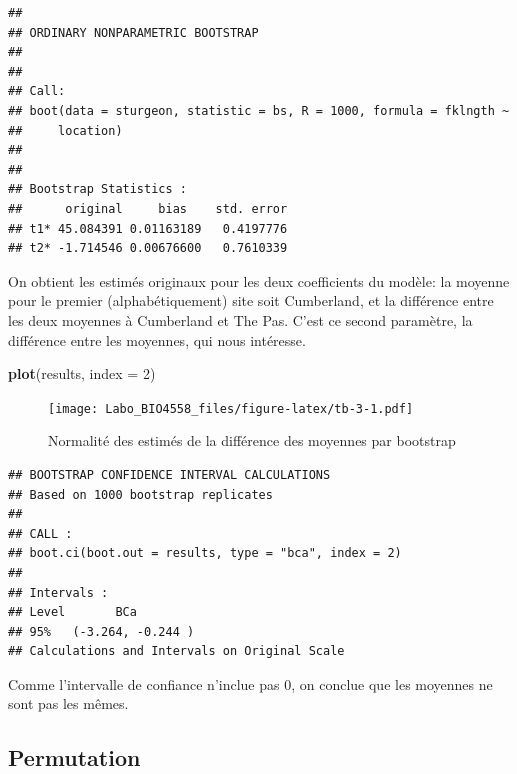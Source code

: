 \documentclass[12pt,]{book}
\newenvironment{Shaded}{\begin{snugshade}}{\end{snugshade}}
\newcommand{\CommentTok}[1]{\textcolor[rgb]{0.56,0.35,0.01}{\textit{#1}}}
\newcommand{\DataTypeTok}[1]{\textcolor[rgb]{0.13,0.29,0.53}{#1}}
\newcommand{\DecValTok}[1]{\textcolor[rgb]{0.00,0.00,0.81}{#1}}
\newcommand{\KeywordTok}[1]{\textcolor[rgb]{0.13,0.29,0.53}{\textbf{#1}}}
\newcommand{\NormalTok}[1]{#1}
\newcommand{\StringTok}[1]{\textcolor[rgb]{0.31,0.60,0.02}{#1}}
\begin{document}
\begin{verbatim}
## 
## ORDINARY NONPARAMETRIC BOOTSTRAP
## 
## 
## Call:
## boot(data = sturgeon, statistic = bs, R = 1000, formula = fklngth ~ 
##     location)
## 
## 
## Bootstrap Statistics :
##      original     bias    std. error
## t1* 45.084391 0.01163189   0.4197776
## t2* -1.714546 0.00676600   0.7610339
\end{verbatim}

On obtient les estimés originaux pour les deux coefficients du modèle: la moyenne pour le premier (alphabétiquement) site soit Cumberland, et la différence entre les deux moyennes à Cumberland et The Pas. C'est ce second paramètre, la différence entre les moyennes, qui nous intéresse.

\begin{Shaded}
\begin{Highlighting}[]
\KeywordTok{plot}\NormalTok{(results, }\DataTypeTok{index =} \DecValTok{2}\NormalTok{)}
\end{Highlighting}
\end{Shaded}

\begin{figure}
\centering
\texttt{[image: Labo\_BIO4558\_files/figure-latex/tb-3-1.pdf]}
\caption{\label{fig:tb-3}Normalité des estimés de la différence des moyennes par bootstrap}
\end{figure}

\begin{Shaded}
\end{Shaded}

\begin{verbatim}
## BOOTSTRAP CONFIDENCE INTERVAL CALCULATIONS
## Based on 1000 bootstrap replicates
## 
## CALL : 
## boot.ci(boot.out = results, type = "bca", index = 2)
## 
## Intervals : 
## Level       BCa          
## 95%   (-3.264, -0.244 )  
## Calculations and Intervals on Original Scale
\end{verbatim}

Comme l'intervalle de confiance n'inclue pas 0, on conclue que les moyennes ne sont pas les mêmes.

\hypertarget{permutation}{%
\subsection{Permutation}\label{permutation}}
\end{document}
